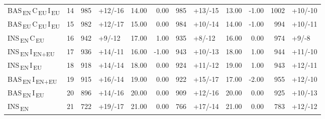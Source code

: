 \begin{tabular}{lrrlrrrlrrrl}
BAS\textsubscript{\,EN}\,C\textsubscript{\,EU}\,I\textsubscript{\,EU} & 14 & 985 & +12/-16 & 14.00 & 0.00 & 985 & +13/-15 & 13.00 & -1.00 & 1002 & +10/-10 \\
BAS\textsubscript{\,EU}\,C\textsubscript{\,EU}\,I\textsubscript{\,EU} & 15 & 982 & +12/-17 & 15.00 & 0.00 & 984 & +10/-14 & 14.00 & -1.00 & 994 & +10/-11 \\
INS\textsubscript{\,EN}\,C\textsubscript{\,EU} & 16 & 942 & +9/-12 & 17.00 & 1.00 & 935 & +8/-12 & 16.00 & 0.00 & 974 & +9/-8 \\
INS\textsubscript{\,EN}\,I\textsubscript{\,EN+EU} & 17 & 936 & +14/-11 & 16.00 & -1.00 & 943 & +10/-13 & 18.00 & 1.00 & 944 & +11/-10 \\
INS\textsubscript{\,EN}\,I\textsubscript{\,EU} & 18 & 918 & +14/-14 & 18.00 & 0.00 & 924 & +11/-12 & 19.00 & 1.00 & 943 & +12/-11 \\
BAS\textsubscript{\,EN}\,I\textsubscript{\,EN+EU} & 19 & 915 & +16/-14 & 19.00 & 0.00 & 922 & +15/-17 & 17.00 & -2.00 & 955 & +12/-10 \\
BAS\textsubscript{\,EN}\,I\textsubscript{\,EU} & 20 & 896 & +14/-16 & 20.00 & 0.00 & 909 & +12/-16 & 20.00 & 0.00 & 925 & +10/-13 \\
INS\textsubscript{\,EN} & 21 & 722 & +19/-17 & 21.00 & 0.00 & 766 & +17/-14 & 21.00 & 0.00 & 783 & +12/-12 \\
\bottomrule
\end{tabular}

